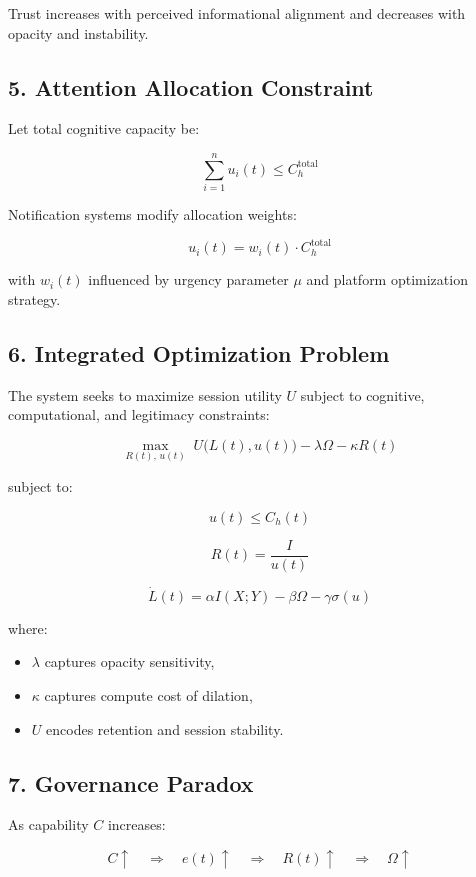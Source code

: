 \documentclass[12pt]{article}
\begin{document}
Trust increases with perceived informational alignment and decreases with opacity and instability.

\subsection*{5. Attention Allocation Constraint}

Let total cognitive capacity be:

\[
\sum_{i=1}^{n} u_i(t) \le C_h^{\text{total}}
\]

Notification systems modify allocation weights:

\[
u_i(t) = w_i(t) \cdot C_h^{\text{total}}
\]

with $w_i(t)$ influenced by urgency parameter $\mu$ and platform optimization strategy.

\subsection*{6. Integrated Optimization Problem}

The system seeks to maximize session utility $U$ subject to cognitive, computational, and legitimacy constraints:

\begin{equation}
\max_{R(t),\,u(t)} 
\; U\bigl(L(t), u(t)\bigr)
- \lambda \Omega
- \kappa R(t)
\end{equation}

subject to:

\[
u(t) \le C_h(t)
\]

\[
R(t) = \frac{I}{u(t)}
\]

\[
\dot{L}(t) = \alpha I(X;Y) - \beta \Omega - \gamma \sigma(u)
\]

where:

\begin{itemize}
\item $\lambda$ captures opacity sensitivity,
\item $\kappa$ captures compute cost of dilation,
\item $U$ encodes retention and session stability.
\end{itemize}

\subsection*{7. Governance Paradox}

As capability $C$ increases:

\[
C \uparrow \quad \Rightarrow \quad e(t) \uparrow \quad \Rightarrow \quad R(t) \uparrow \quad \Rightarrow \quad \Omega \uparrow
\]
\end{document}
